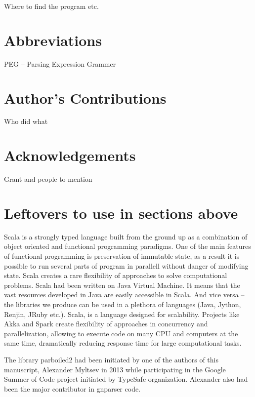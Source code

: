 \documentclass{bmcart}
\begin{document}
Where to find the program etc.

\section*{Abbreviations}

PEG -- Parsing Expression Grammer

\section*{Author's Contributions}

Who did what

\section*{Acknowledgements}

Grant and people to mention

\section*{Leftovers to use in sections above}
Scala is a strongly typed language built from the ground up as a combination of
object oriented and functional programming paradigms. One of the main features
of functional programming is preservation of immutable state, as a result it is
possible to run several parts of program in parallell without danger of
modifying state. Scala creates a rare flexibility of approaches to solve
computational problems. Scala had been written on Java Virtual Machine. It
means that the vast resources developed in Java are easily accessible in Scala.
And vice versa -- the libraries we produce can be used in a plethora of
languages (Java, Jython, Renjin, JRuby etc.). Scala, is a language designed for
scalability. Projects like Akka and Spark create flexibility of approaches in
concurrency and parallelization, allowing to execute code on many CPU and
computers at the same time, dramatically reducing response time for large
computational tasks.

The library parboiled2 had been initiated by one of the authors of this
manuscript, Alexander Myltsev in 2013 while participating in the Google Summer
of Code project initiated by TypeSafe organization. Alexander also had been the
major contributor in gnparser code.

\end{document}
